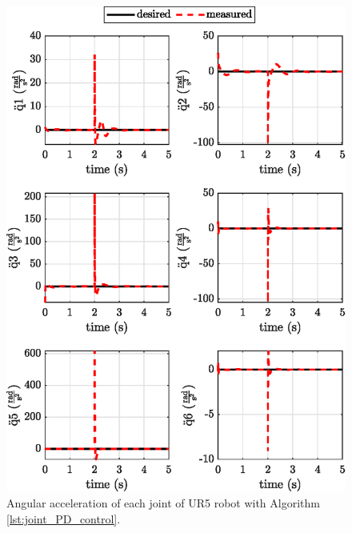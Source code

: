 \begin{figure}
    \centering
    \includegraphics{images/act_1.3/joint_acceleration.eps}
    \caption{Angular acceleration of each joint of UR5 robot with Algorithm \ref{lst:joint_PD_control}.}
    \label{fig:act_1.3_joint_acceleration}
\end{figure}